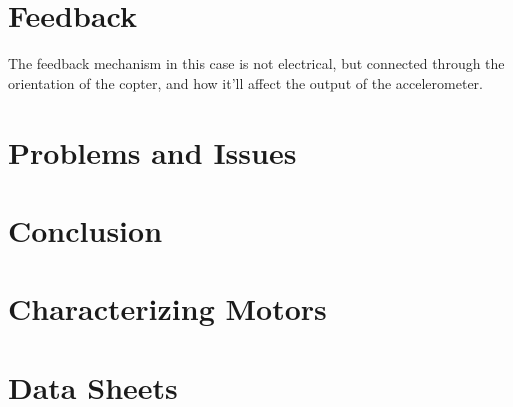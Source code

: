 \documentclass[11pt]{article} %
\begin{document}
\section{Feedback}
 The feedback mechanism in this case is not electrical, but connected through the orientation of the copter, and how it'll affect the output of the accelerometer.
\\

\section{Problems and Issues}

\section{Conclusion}

\appendix
\section{Characterizing Motors}
\section{Data Sheets}
\end{document}
